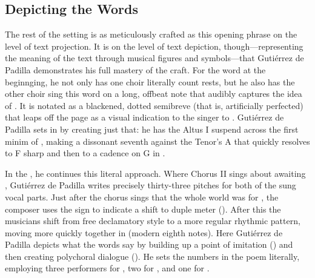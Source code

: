 
\subsection{Depicting the Words}

The rest of the setting is as meticulously crafted as this opening phrase on the
level of text projection.
It is on the level of text depiction, though---representing the meaning of the
text through musical figures and symbols---that Gutiérrez de Padilla
demonstrates his full mastery of the craft.
For the word  at the beginnging, he not only has one choir
literally count rests, but he also has the other choir sing this word on a
long, offbeat note that audibly captures the idea of .
It is notated as a blackened, dotted semibreve (that is, artificially perfected)
that leaps off the page as a visual indication to the singer to .
Gutiérrez de Padilla sets  in 
by creating just that: he has the Altus I suspend across the first minim of
, making a dissonant seventh against the Tenor's A that quickly
resolves to F sharp and then to a cadence on G in .


In the , he continues this literal approach.
Where Chorus II sings about awaiting , Gutiérrez de
Padilla writes precisely thirty-three pitches for both of the sung vocal parts.
Just after the chorus sings that the whole world was  for
, the composer uses the \meterC{} sign to indicate a shift to
duple meter ().
After this the musicians shift from free declamatory style to a more regular
rhythmic pattern, moving more quickly together in  (modern
eighth notes).%
    \Autocite
    [This is the term used by Cerone and villancico poets (see  in ):]
    [\XXX]
    {Cerone:Melopeo}
Here Gutiérrez de Padilla depicts what the words say by building up a point of
imitation  () and then
creating polychoral dialogue ().
He sets the numbers in the poem literally, employing three performers for
, two for , and one for .


